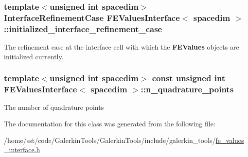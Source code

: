 \subsubsection[{\texorpdfstring{initialized\+\_\+interface\+\_\+refinement\+\_\+case}{initialized_interface_refinement_case}}]{\setlength{\rightskip}{0pt plus 5cm}template$<$unsigned int spacedim$>$ {\bf Interface\+Refinement\+Case} {\bf F\+E\+Values\+Interface}$<$ spacedim $>$\+::initialized\+\_\+interface\+\_\+refinement\+\_\+case\hspace{0.3cm}{\ttfamily [private]}}\hypertarget{class_f_e_values_interface_a4a14b4fa181df533a6c7e7971fad5c4e}{}\label{class_f_e_values_interface_a4a14b4fa181df533a6c7e7971fad5c4e}
The refinement case at the interface cell with which the {\bf F\+E\+Values} objects are initialized currently. 
\subsubsection[{\texorpdfstring{n\+\_\+quadrature\+\_\+points}{n_quadrature_points}}]{\setlength{\rightskip}{0pt plus 5cm}template$<$unsigned int spacedim$>$ const unsigned int {\bf F\+E\+Values\+Interface}$<$ spacedim $>$\+::n\+\_\+quadrature\+\_\+points}\hypertarget{class_f_e_values_interface_a100afc348b15432f9e241ff56ebffa8d}{}\label{class_f_e_values_interface_a100afc348b15432f9e241ff56ebffa8d}
The number of quadrature points 

The documentation for this class was generated from the following file\+:\begin{DoxyCompactItemize}
\item 
/home/sst/code/\+Galerkin\+Tools/\+Galerkin\+Tools/include/galerkin\+\_\+tools/\hyperlink{fe__values__interface_8h}{fe\+\_\+values\+\_\+interface.\+h}\end{DoxyCompactItemize}
